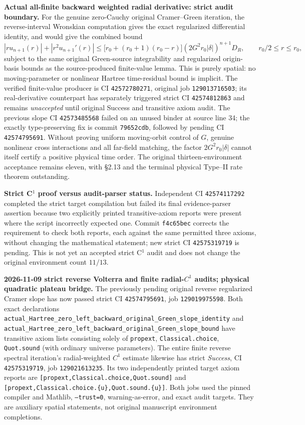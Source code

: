 \documentclass[11pt]{amsart}
\begin{document}
\medskip
\noindent\textbf{Actual all-finite backward weighted radial derivative: strict audit boundary.}
For the genuine zero-Cauchy original Cramer--Green iteration,
the reverse-interval Wronskian computation gives the exact
regularized differential identity, and would give the combined bound
\[
 \left|r u_{n+1}(r)\right|+
 \left|r^2u_{n+1}'(r)\right|
 \le \bigl[r_0+(r_0+1)(r_0-r)\bigr]
       (2G^2r_0|\delta|)^{n+1}D_R,
 \qquad r_0/2\le r\le r_0,
\]
subject to the same original Green-source integrability and
regularized origin-basis bounds as the source-produced finite-value
lemma. This is purely spatial: no moving-parameter or nonlinear
Hartree time-residual bound is implicit. The verified finite-value
producer is CI \texttt{42572780271}, original job
\texttt{129013716503}; its real-derivative counterpart has
separately triggered strict CI \texttt{42574812863} and remains
\emph{unaccepted} until original Success and transitive axiom audit.
The previous slope CI \texttt{42573485568} failed on an unused binder
at source line 34; the exactly type-preserving fix is commit
\texttt{79652cdb}, followed by pending CI \texttt{42574795691}.
Without proving uniform moving-orbit control of $G$, genuine
nonlinear cross interactions and all far-field matching, the
factor $2G^2r_0|\delta|$ cannot itself certify a positive
physical time order. The original thirteen-environment acceptance
remains eleven, with \S2.13 and the terminal physical Type--II
rate theorem outstanding.


\medskip
\noindent\textbf{Strict C$^1$ proof versus audit-parser status.}
Independent CI \texttt{42574117292} completed the strict target
compilation but failed its final evidence-parser assertion because
two explicitly printed transitive-axiom reports were present where
the script incorrectly expected one. Commit \texttt{f4c65bec}
corrects the requirement to check both reports, each against the
same permitted three axioms, without changing the mathematical
statement; new strict CI \texttt{42575319719} is pending. This is
not yet an accepted strict C$^1$ audit and does not change the
original environment count $11/13$.


\medskip
\noindent\textbf{2026-11-09 strict reverse Volterra and finite radial-$C^1$ audits; physical quadratic plateau bridge.}
The previously pending original reverse regularized Cramer slope
has now passed strict CI \texttt{42574795691}, job
\texttt{129019975598}. Both exact declarations
\texttt{actual\_Hartree\_zero\_left\_backward\_original\_Green\_slope\_identity}
and \texttt{actual\_Hartree\_zero\_left\_backward\_original\_Green\_slope\_bound}
have transitive axiom lists consisting solely of
\texttt{propext}, \texttt{Classical.choice}, \texttt{Quot.sound}
(with ordinary universe parameters).
The entire finite reverse spectral iteration's radial-weighted
$C^1$ estimate likewise has strict \emph{Success},
CI \texttt{42575319719}, job \texttt{129021613235}.
Its two independently printed target axiom reports are
\texttt{[propext,Classical.choice,Quot.sound]} and
\texttt{[propext,Classical.choice.\{u\},Quot.sound.\{u\}]}.
Both jobs used the pinned compiler and Mathlib,
\texttt{--trust=0}, warning-as-error, and exact audit targets.
They are auxiliary spatial statements, not original manuscript
environment completions.
\end{document}
